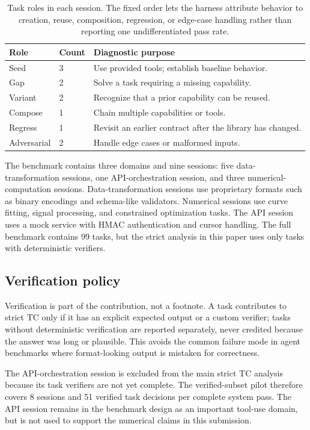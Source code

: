 \documentclass[sigconf,anonymous,review,natbib=false]{acmart}
\begin{document}
\begin{table}[t]
\centering
\small
\caption{Task roles in each session. The fixed order lets the harness attribute behavior to creation, reuse, composition, regression, or edge-case handling rather than reporting one undifferentiated pass rate.}
\label{tab:task-types}
\begin{tabular}{llp{4.5cm}}
\toprule
\textbf{Role} & \textbf{Count} & \textbf{Diagnostic purpose} \\
\midrule
Seed & 3 & Use provided tools; establish baseline behavior. \\
Gap & 2 & Solve a task requiring a missing capability. \\
Variant & 2 & Recognize that a prior capability can be reused. \\
Compose & 1 & Chain multiple capabilities or tools. \\
Regress & 1 & Revisit an earlier contract after the library has changed. \\
Adversarial & 2 & Handle edge cases or malformed inputs. \\
\bottomrule
\end{tabular}
\end{table}

The benchmark contains three domains and nine sessions: five data-transformation sessions, one API-orchestration session, and three numerical-computation sessions. Data-transformation sessions use proprietary formats such as binary encodings and schema-like validators. Numerical sessions use curve fitting, signal processing, and constrained optimization tasks. The API session uses a mock service with HMAC authentication and cursor handling. The full benchmark contains 99 tasks, but the strict analysis in this paper uses only tasks with deterministic verifiers.

\subsection{Verification policy}

Verification is part of the contribution, not a footnote. A task contributes to strict TC only if it has an explicit expected output or a custom verifier; tasks without deterministic verification are reported separately, never credited because the answer was long or plausible. This avoids the common failure mode in agent benchmarks where format-looking output is mistaken for correctness.

The API-orchestration session is excluded from the main strict TC analysis because its task verifiers are not yet complete. The verified-subset pilot therefore covers 8 sessions and 51 verified task decisions per complete system pass. The API session remains in the benchmark design as an important tool-use domain, but is not used to support the numerical claims in this submission.
\end{document}
